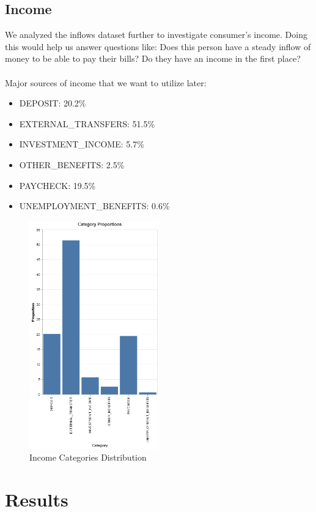 \documentclass[12pt,letterpaper]{article}
\begin{document}
\subsection{Income}
{We analyzed the inflows dataset further to investigate consumer’s income. Doing this would help us answer questions like: Does this person have a steady inflow of money to be able to pay their bills? Do they have an income in the first place? \\ \\ Major sources of income that we want to utilize later:}
\begin{itemize}
    \item {DEPOSIT}: 20.2\%
    \item {EXTERNAL\_TRANSFERS}: 51.5\%
    \item {INVESTMENT\_INCOME}: 5.7\%
    \item {OTHER\_BENEFITS}: 2.5\%
    \item {PAYCHECK}: 19.5\%
    \item {UNEMPLOYMENT\_BENEFITS}: 0.6\%
\end{itemize}

\begin{figure}[H]
    \centering
    \includegraphics[width=0.5\textwidth]{pngs/income.png}
    \caption{Income Categories Distribution}
    \label{fig:enter-label}
\end{figure}



\section{Results}
\end{document}

